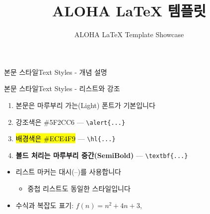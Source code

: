 

\title{ALOHA \LaTeX{} 템플릿}
\subtitle{ALOHA LaTeX Template Showcase}



\frame{\titlepage}


\begin{frame}{본문 스타일}{Text Styles - 개념 설명}
\end{frame}

\begin{frame}{본문 스타일}{Text Styles - 리스트와 강조}
  \begin{enumerate}
    \item 본문은 마루부리 가는(Light) 폰트가 기본입니다
    \item \alert{강조색은 \#5F2CC6} — \texttt{\textbackslash alert\{...\}}
    \item \hl{배경색은 \#ECE4F9} — \texttt{\textbackslash hl\{...\}}
    \item \textbf{볼드 처리는 마루부리 중간(SemiBold)} — \texttt{\textbackslash textbf\{...\}}
  \end{enumerate}
  \vspace{2mm}
  \vspace{4mm}
  \begin{itemize}
    \item 리스트 마커는 대시(–)를 사용합니다
    \begin{itemize}
      \item 중첩 리스트도 동일한 스타일입니다
    \end{itemize}
    \item 수식과 복잡도 표기: $f(n) = n^2 + 4n + 3$, 
  \end{itemize}
\end{frame}

